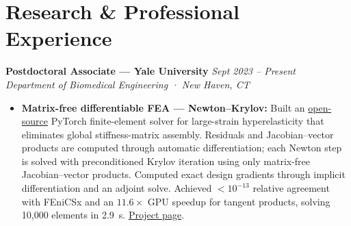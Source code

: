 \documentclass[10pt, letterpaper]{article}
\newcommand{\jobheader}[2]{%
  \noindent
  \textbf{\color{darkgray}#1}
  \hfill
  {\color{midgray}\textit{#2}}
  \\[-2pt]
}
\newcommand{\subline}[1]{%
  \noindent
  {\color{midgray}\textit{#1}}
  \par\vspace{2pt}
}
\begin{document}

\section{Research \& Professional Experience}

\jobheader
{Postdoctoral Associate --- Yale University}
{Sept 2023 -- Present}

\subline
{Department of Biomedical Engineering · New Haven, CT}

\begin{itemize}


\item \textbf{Matrix-free differentiable FEA --- Newton--Krylov:}
Built an
\href{https://github.com/miladshirani/Differentiable-FEA}
{open-source}
PyTorch finite-element solver for large-strain hyperelasticity that eliminates
global stiffness-matrix assembly. Residuals and Jacobian--vector products are
computed through automatic differentiation; each Newton step is solved with
preconditioned Krylov iteration using only matrix-free Jacobian--vector
products. Computed exact design gradients through implicit differentiation
and an adjoint solve. Achieved $<10^{-13}$ relative agreement with FEniCSx
and an $11.6\times$ GPU speedup for tangent products, solving 10,000
elements in 2.9~s.
\href{https://miladshirani.github.io/research-differentiable-fea.html}
{Project page}.



\end{itemize}
\end{document}

